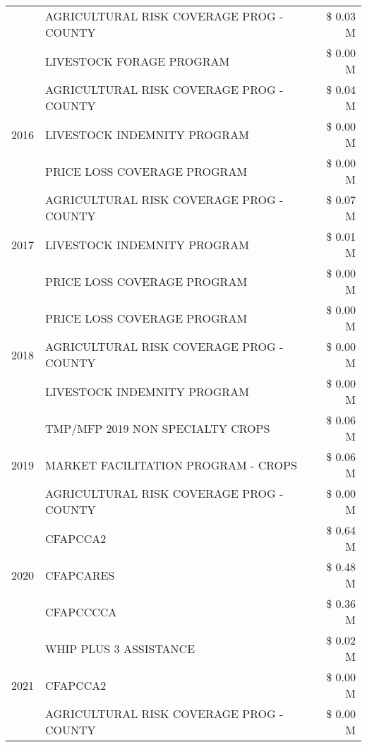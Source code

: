 \begin{tabular}{llr}
 & AGRICULTURAL RISK COVERAGE PROG - COUNTY & \$ 0.03 M \\
 & LIVESTOCK FORAGE PROGRAM & \$ 0.00 M \\
\cline{1-3}
\multirow[t]{3}{*}{2016} & AGRICULTURAL RISK COVERAGE PROG - COUNTY & \$ 0.04 M \\
 & LIVESTOCK INDEMNITY PROGRAM & \$ 0.00 M \\
 & PRICE LOSS COVERAGE PROGRAM & \$ 0.00 M \\
\cline{1-3}
\multirow[t]{3}{*}{2017} & AGRICULTURAL RISK COVERAGE PROG - COUNTY & \$ 0.07 M \\
 & LIVESTOCK INDEMNITY PROGRAM & \$ 0.01 M \\
 & PRICE LOSS COVERAGE PROGRAM & \$ 0.00 M \\
\cline{1-3}
\multirow[t]{3}{*}{2018} & PRICE LOSS COVERAGE PROGRAM & \$ 0.00 M \\
 & AGRICULTURAL RISK COVERAGE PROG - COUNTY & \$ 0.00 M \\
 & LIVESTOCK INDEMNITY PROGRAM & \$ 0.00 M \\
\cline{1-3}
\multirow[t]{3}{*}{2019} & TMP/MFP 2019 NON SPECIALTY CROPS & \$ 0.06 M \\
 & MARKET FACILITATION PROGRAM - CROPS & \$ 0.06 M \\
 & AGRICULTURAL RISK COVERAGE PROG - COUNTY & \$ 0.00 M \\
\cline{1-3}
\multirow[t]{3}{*}{2020} & CFAPCCA2 & \$ 0.64 M \\
 & CFAPCARES & \$ 0.48 M \\
 & CFAPCCCCA & \$ 0.36 M \\
\cline{1-3}
\multirow[t]{3}{*}{2021} & WHIP PLUS 3 ASSISTANCE & \$ 0.02 M \\
 & CFAPCCA2 & \$ 0.00 M \\
 & AGRICULTURAL RISK COVERAGE PROG - COUNTY & \$ 0.00 M \\
\cline{1-3}
\bottomrule
\end{tabular}
